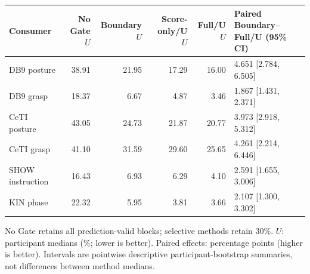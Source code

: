 \begingroup
\small
\setlength{\tabcolsep}{3pt}
\renewcommand{\arraystretch}{1.05}
\begin{tabular}{lrrrrl}
\toprule
Consumer & No Gate $U$ & Boundary $U$ & Score-only/U $U$ & Full/U $U$ & Paired Boundary--Full/U (95\% CI)\\
\midrule
DB9 posture & 38.91 & 21.95 & 17.29 & 16.00 & 4.651 [2.784, 6.505]\\
DB9 grasp & 18.37 & 6.67 & 4.87 & 3.46 & 1.867 [1.431, 2.371]\\
CeTI posture & 43.05 & 24.73 & 21.87 & 20.77 & 3.973 [2.918, 5.312]\\
CeTI grasp & 41.10 & 31.59 & 29.60 & 25.65 & 4.261 [2.214, 6.446]\\
SHOW instruction & 16.43 & 6.93 & 6.29 & 4.10 & 2.591 [1.655, 3.006]\\
KIN phase & 22.32 & 5.95 & 3.81 & 3.66 & 2.107 [1.300, 3.302]\\
\bottomrule
\end{tabular}
\par\smallskip
\begin{minipage}{\linewidth}\footnotesize
No Gate retains all prediction-valid blocks; selective methods retain 30\%. $U$: participant medians (\%; lower is better). Paired effects: percentage points (higher is better). Intervals are pointwise descriptive participant-bootstrap summaries, not differences between method medians.
\end{minipage}
\endgroup
